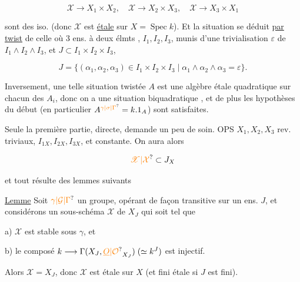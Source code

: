 \[
 \mathscr X\longrightarrow X_1\times X_2,\quad \mathscr X\longrightarrow X_2\times X_3,\quad \mathscr X\longrightarrow X_3\times X_1
\]

sont des iso. (donc $\mathscr X$ est  \uline{étale} sur $X=\operatorname{Spec} k$). Et la situation se déduit \uline{par twist} de celle où 3 ens. à deux élmts \deleted{\unsure{$\xi$}}, $I_1,I_2,I_3$, munis d'une trivialisation $\varepsilon$ de $I_1\wedge I_2\wedge I_3$, et  $J\subset I_1\times I_2\times I_3$,

\[
 J=\{(\alpha_1,\alpha_2,\alpha_3)\in I_1\times I_2\times I_3\mid \alpha_1\wedge\alpha_2\wedge\alpha_3=\varepsilon\}.
\]


Inversement,  une telle situation twistée $A$ est une algèbre étale quadratique sur chacun des $A_i$, donc on a une situation biquadratique , et de plus les hypothèses du début (en particulier $A^{\unsure{\gamma|\sigma|\Gamma}}=k.1_A$) sont satisfaites.

 Seule la première partie, directe, demande un peu de soin. OPS $X_1,X_2,X_3$ rev. triviaux, $I_{1X},I_{2X},I_{3X}$, et   constante.  On aura alors

\[
 \unsure{\mathscr X|\mathcal X}\subset J_X
\]

et tout résulte des lemmes suivants

\uline{Lemme} Soit $\unsure{\gamma|\mathcal G|\Gamma}$ un groupe, opérant de façon transitive sur un ens. $J$, et considérons un sous-schéma $\mathscr X$ de $X_J$  qui soit tel que

a) $\mathscr X$ est stable sous $\gamma$, et

b) le composé $k\longrightarrow\Gamma(X_J,\unsure{\underline O|\mathcal O}_{X_J})\;(\simeq k^J)$ est injectif.

Alors $\mathscr X=X_J$, donc $\mathscr X$ est étale sur $X$ (et fini étale si $J$ est fini).

